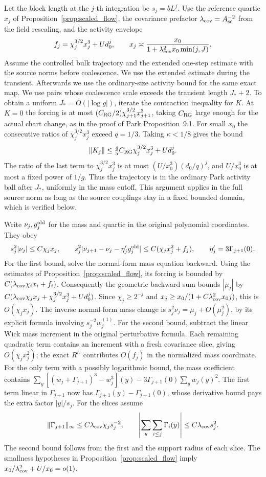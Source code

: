 \documentclass[11pt]{article}
\begin{document}
Let the block length at the \(j\)-th integration be \(s_j=bL^j\).
Use the reference quartic \(x_j\) of
Proposition~\ref{prop:scaled_flow}, the covariance prefactor
\(\lambda_{\rm cov}=A_{\rm sc}^{-2}\) from the field rescaling,
and the activity envelope
\[
 f_j=\chi_j^{3/2}x_j^3+Ud_0^j,\qquad
 x_j\asymp \frac{x_0}{1+\lambda_{\rm cov}^2x_0\min(j,J)} .
\]
Assume the controlled bulk trajectory and the extended one-step
estimate with the source norms before coalescence. We use the
extended estimate during the transient. Afterwards we use the
ordinary-size activity bound for the same exact map. We use pairs
whose coalescence scale exceeds the transient length \(J_*+2\).
To obtain a uniform \(J_*=O(|\log g|)\), iterate the contraction
inequality for \(K\). At \(K=0\) the forcing is at most
\((C_{\rm RG}/2)\chi_{j+1}^{3/2}x_{j+1}^3\), taking
\(C_{\rm RG}\) large enough for the actual chart change, as
in the proof of Park Proposition~9.1. For small \(x_0\) the consecutive
ratios of \(\chi_j^{3/2}x_j^3\) exceed \(q=1/3\).
Taking \(\kappa<1/8\) gives the bound
\[
 \|K_j\|\le \tfrac45 C_{\rm RG}\chi_j^{3/2}x_j^3+U d_0^j .
\]
The ratio of the last term to \(\chi_j^{3/2}x_j^3\) is at most
\((U/x_0^3)(d_0/q)^j\), and \(U/x_0^3\) is at most a fixed
power of \(1/g\). Thus the trajectory is in the ordinary
Park activity ball after \(J_*\), uniformly in the mass cutoff.
This argument applies in the full source norm as long as the
source couplings stay in a fixed bounded domain, which is
verified below.

Write \(\nu_j,g_j^{\rm old}\) for the mass and quartic in the
original polynomial coordinates. They obey
\[
 s_j^2|\nu_j|\le C\chi_jx_j,\qquad
 s_j^2|\nu_{j+1}-\nu_j-\eta'_jg_j^{\rm old}|
       \le C(\chi_jx_j^2+f_j),
 \qquad \eta'_j=3\Gamma_{j+1}(0).
\]
For the first bound, solve the normal-form mass equation
backward. Using the estimates of Proposition~\ref{prop:scaled_flow},
its forcing is bounded by \(C(\lambda_{\rm cov}\chi_i x_i+f_i)\).
Consequently the geometric backward sum bounds \(|\mu_j|\) by
\(C(\lambda_{\rm cov}\chi_j x_j+\chi_j^{3/2}x_j^3+Ud_0^j)\).
Since \(\chi_j\ge 2^{-j}\) and
\(x_j\ge x_0/(1+C\lambda_{\rm cov}^2x_0j)\), this is
\(O(\chi_jx_j)\). The inverse normal-form mass change is
\(s_j^2\nu_j=\mu_j+O(\mu_j^2)\), by its explicit formula
involving \(s_j^{-2}w_j^{(1)}\). For the second bound, subtract
the linear Wick mass increment in the original perturbative
formula. Each remaining quadratic term contains an increment
with a fresh covariance slice, giving \(O(\chi_jx_j^2)\);
the exact \(R^U\) contributes \(O(f_j)\) in the normalized
mass coordinate. For the only term with a possibly logarithmic
bound, the mass coefficient contains
\(\sum_y[(w_j+\Gamma_{j+1})^3-w_j^3](y)
-3\Gamma_{j+1}(0)\sum_y w_j(y)^2\).
The first term linear in \(\Gamma_{j+1}\) now has
\(\Gamma_{j+1}(y)-\Gamma_{j+1}(0)\), whose derivative bound
pays the extra factor \(|y|/s_j\).
For the slices assume
\[
 \|\Gamma_{j+1}\|_\infty\le C\lambda_{\rm cov}\chi_j s_j^{-2},
 \qquad \left|\sum_y\sum_{i\le j}\Gamma_i(y)\right|
       \le C\lambda_{\rm cov}s_j^2 .
\]
The second bound follows from the first and the support radius
of each slice. The smallness hypotheses in
Proposition~\ref{prop:scaled_flow} imply
\(x_0/\lambda_{\rm cov}^2+U/x_0=o(1)\).
\end{document}
